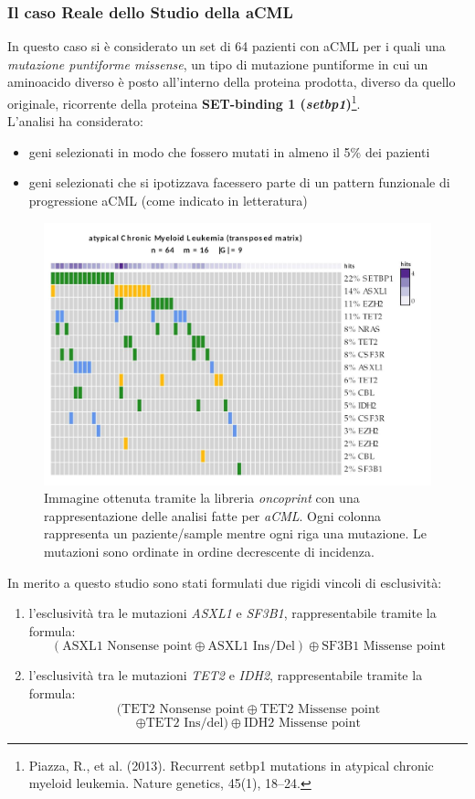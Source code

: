 \documentclass[a4paper,12pt, oneside]{book}
\begin{document}
\subsubsection{Il caso Reale dello Studio della aCML}
In questo caso si è considerato un set di 64 pazienti con aCML per i quali una
\textit{mutazione puntiforme missense}, un tipo di mutazione puntiforme in cui
un aminoacido diverso è posto all’interno della proteina prodotta, diverso da
quello originale, ricorrente della proteina \textbf{SET-binding 1 
  (\textit{setbp1})}\footnote{Piazza, R., et al. (2013). Recurrent setbp1
  mutations in atypical chronic myeloid leukemia. Nature genetics, 45(1),
  18–24.}.  \\
L'analisi ha considerato:
\begin{itemize}
  \item geni selezionati in modo che fossero mutati in almeno il 5\% dei
  pazienti
  \item geni selezionati che si ipotizzava facessero parte di un
  pattern funzionale di progressione aCML (come indicato in letteratura) 
\end{itemize}
\begin{figure}
  \centering
  \includegraphics[scale = 0.22]{img/acml1.jpg}
  \caption{Immagine ottenuta tramite la libreria \textit{oncoprint} con una
    rappresentazione delle analisi fatte per \textit{aCML}. Ogni colonna
    rappresenta un paziente/sample mentre ogni riga una mutazione. Le mutazioni
    sono ordinate in ordine decrescente di incidenza.}
\end{figure}
In merito a questo studio sono stati formulati due rigidi vincoli di
esclusività:
\begin{enumerate}
  \item l'esclusività tra le mutazioni \textit{ASXL1} e \textit{SF3B1},
  rappresentabile tramite la formula:
  {\small{\[(\mbox{ASXL1 Nonsense point} \oplus \mbox{ASXL1 Ins/Del}) \oplus
        \mbox{SF3B1 Missense point}\] }}
  \item  l'esclusività tra le mutazioni \textit{TET2} e \textit{IDH2},
  rappresentabile tramite la formula:
  \[(\mbox{TET2 Nonsense point} \oplus \mbox{TET2 Missense point}\]\[ \oplus
    \mbox{TET2 Ins/del}) \oplus \mbox{IDH2 Missense point}\]
\end{enumerate}
\end{document}
